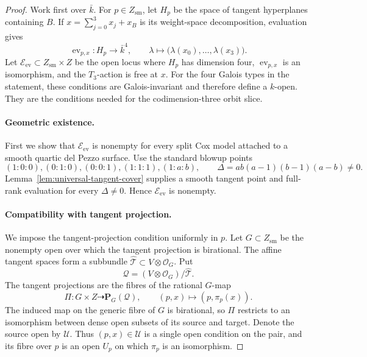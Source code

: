 \documentclass[11pt]{article}
\theoremstyle{remark}
\newcommand{\PP}{\mathbf P}
\begin{document}
\begin{proof}
Work first over \(\bar k\).  For \(p\in Z_{\mathrm{sm}}\), let \(H_p\)
be the space of tangent
hyperplanes containing \(B\).  If \(x=\sum_{j=0}^3x_j+x_B\) is its
weight-space decomposition, evaluation gives
\[
 \operatorname{ev}_{p,x}:H_p\longrightarrow\bar k^4,
 \qquad \lambda\longmapsto
 \bigl(\lambda(x_0),\ldots,\lambda(x_3)\bigr).
\]
Let \(\mathcal E_{\mathrm{ev}}\subset Z_{\mathrm{sm}}\times Z\) be the
open locus where \(H_p\) has dimension four,
\(\operatorname{ev}_{p,x}\) is an isomorphism, and the \(T_3\)-action is
free at \(x\).  For the four Galois types in the statement, these
conditions are Galois-invariant and therefore define a \(k\)-open.
They are the conditions needed for the codimension-three orbit slice.

\paragraph{Geometric existence.}
First we show that \(\mathcal E_{\mathrm{ev}}\) is nonempty for every
split Cox model attached to a smooth quartic del Pezzo surface.  Use the
standard blowup points
\begin{equation}
 (1:0:0),(0:1:0),(0:0:1),(1:1:1),(1:a:b),
 \qquad \Delta=ab(a-1)(b-1)(a-b)\ne0.
 \label{eq:moduli-discriminant}
\end{equation}
Lemma~\ref{lem:universal-tangent-cover} supplies a smooth tangent point and
full-rank evaluation for every \(\Delta\ne0\). Hence
\(\mathcal E_{\mathrm{ev}}\) is nonempty.
\paragraph{Compatibility with tangent projection.}
We impose the tangent-projection condition uniformly in \(p\).  Let
\(G\subset Z_{\mathrm{sm}}\) be the nonempty open over which the tangent
projection is birational.  The affine tangent spaces form a subbundle
\(\widehat{\mathcal T}\subset V\otimes\mathcal O_G\).  Put
\[
 \mathcal Q=(V\otimes\mathcal O_G)/\widehat{\mathcal T}.
\]
The tangent projections are the fibres of the rational \(G\)-map
\[
 \Pi:G\times Z\dashrightarrow\PP_G(\mathcal Q),
 \qquad (p,x)\longmapsto(p,\pi_p(x)).
\]
The induced map on the generic fibre of \(G\) is birational, so \(\Pi\)
restricts to an isomorphism
between dense open subsets of its source and target.  Denote the source open
by \(\mathcal U\).  Thus \((p,x)\in\mathcal U\) is a single open condition on
the pair, and its fibre over \(p\) is an open \(U_p\) on which \(\pi_p\) is
an isomorphism.


\end{proof}
\end{document}

